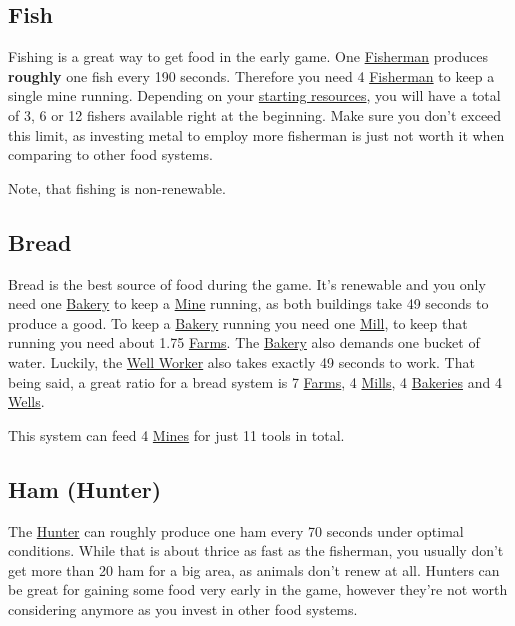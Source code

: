 \documentclass[11pt]{article}
\begin{document}
\subsection{Fish}
\label{sec:fish}

Fishing is a great way to get food in the early game. One \hyperref[fisherman]{Fisherman} produces \textbf{roughly} one fish every 190 seconds. Therefore you need 4 \hyperref[fisherman]{Fisherman} to keep a single mine running. Depending on your \hyperref[startresources]{starting resources}, you will have a total of 3, 6 or 12 fishers available right at the beginning. Make sure you don't exceed this limit, as investing metal to employ more fisherman is just not worth it when comparing to other food systems.

Note, that fishing is non-renewable.

\subsection{Bread}
\label{sec:bread}

Bread is the best source of food during the game. It's renewable and you only need one \hyperref[bakery]{Bakery} to keep a \hyperref[mine]{Mine} running, as both buildings take 49 seconds to produce a good. To keep a \hyperref[bakery]{Bakery} running you need one \hyperref[mill]{Mill}, to keep that running you need about 1.75 \hyperref[farm]{Farms}. The \hyperref[bakery]{Bakery} also demands one bucket of water. Luckily, the \hyperref[well]{Well Worker} also takes exactly 49 seconds to work. That being said, a great ratio for a bread system is 7 \hyperref[farm]{Farms}, 4 \hyperref[mill]{Mills}, 4 \hyperref[bakery]{Bakeries} and 4 \hyperref[well]{Wells}.

This system can feed 4 \hyperref[mine]{Mines} for just 11 tools in total.

\subsection{Ham (Hunter)}
\label{sec:hamhunter}

The  \hyperref[hunter]{Hunter} can roughly produce one ham every 70 seconds under optimal conditions. While that is about thrice as fast as the fisherman, you usually don't get more than 20 ham for a big area, as animals don't renew at all. Hunters can be great for gaining some food very early in the game, however they're not worth considering anymore as you invest in other food systems.
\end{document}
